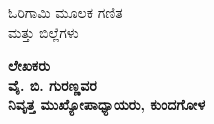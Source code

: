
\vfill 

\thispagestyle{empty}
\begin{center}
{\fontsize{30}{32}\selectfont ಓರಿಗಾಮಿ ಮೂಲಕ ಗಣಿತ \\[0.2cm]
 ಮತ್ತು ಬಿಲ್ಲೆಗಳು}
\vfill


{\Large\bfseries ಲೇಖಕರು}\\[4pt]
{\LARGE\bfseries ವೈ. ಬಿ. ಗುರಣ್ಣವರ }\\[4pt]
{\LARGE\bfseries ನಿವೃತ್ತ ಮುಖ್ಯೋಪಾಧ್ಯಾಯರು, ಕುಂದಗೋಳ}

\vfill




\end{center}
